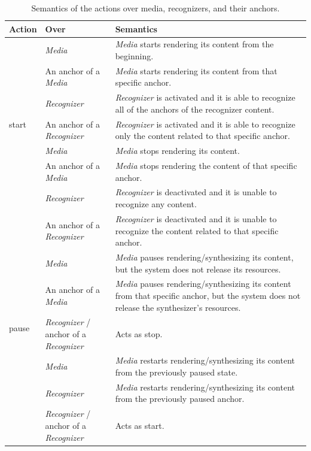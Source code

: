 \documentclass[
  doutorado,
  american
]{ThesisPUC}
\begin{document}
\begin{table}[H]
\scriptsize
\def\arraystretch{1.5}
\begin{tabular}[!ht]{ m{1cm} m{4.5cm} m{7cm} }
	\hline
	\textbf{Action} & \textbf{Over}
		& \textbf{Semantics} \\

	\hline
	\multirow{7}{*}{start} 
	& \textit{Media} &\textit{Media} starts rendering its content from the beginning.\\
	\cline{2-3}
	& An anchor of a \textit{Media} &	\textit{Media} starts rendering its
	content from that specific anchor. \\
	\cline{2-3}
	& \textit{Recognizer} &	\textit{Recognizer} is activated and it is able to 
	recognize all of the anchors of the recognizer content. \\
	\cline{2-3}
	& An anchor of a \textit{Recognizer} &	\textit{Recognizer} is activated 
	and it is able to recognize only the content related to that specific 
	anchor. \\
	\hline

	\multirow{6}{*}{stop}
	& \textit{Media} & \textit{Media} stops rendering its content.\\
	\cline{2-3}
	& An anchor of a \textit{Media} &	\textit{Media} stops rendering the 
	content of that specific anchor. \\
	\cline{2-3}
	& \textit{Recognizer} &	\textit{Recognizer} is deactivated and it is unable 
	to recognize any content. \\
	\cline{2-3}
	& An anchor of a \textit{Recognizer} &	\textit{Recognizer} is deactivated 
	and it is unable to recognize the content related to that specific anchor.\\
	\hline

	\multirow{5}{*}{pause}
	& \textit{Media} &	\textit{Media} pauses rendering/synthesizing its 
	content, but 
	the system does not release its resources.\\
	\cline{2-3}
	& An anchor of a \textit{Media} &	\textit{Media} pauses 
	rendering/synthesizing its 
	content from that specific anchor, but the system does not release the 
	synthesizer’s resources. \\
	\cline{2-3}
	& \textit{Recognizer} / anchor of a \textit{Recognizer} &	Acts as stop. \\
	\hline

	\multirow{5}{*}{resume}
	& \textit{Media} &	\textit{Media} restarts rendering/synthesizing its 
	content from 
	the previously paused state. \\
	\cline{2-3}
	& \textit{Recognizer} &	\textit{Media} restarts rendering/synthesizing its 
	content 
	from the previously paused anchor. \\
	\cline{2-3}
	& \textit{Recognizer} / anchor of a \textit{Recognizer} &	Acts as start. \\
	\hline
\end{tabular}
\caption{Semantics of the actions over media, recognizers, and their anchors.}
\label{table:relationship}
\end{table}
\end{document}
